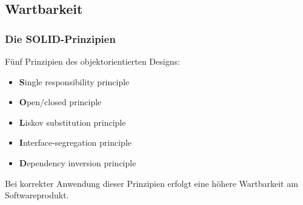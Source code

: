 \documentclass{beamer} %
\begin{document}
\subsection{Wartbarkeit}
\begin{frame}
\frametitle{Die SOLID-Prinzipien}

Fünf Prinzipien des objektorientierten Designs:\newline
\begin{itemize}
\item \textbf{S}ingle responsibility principle
\item \textbf{O}pen/closed principle
\item \textbf{L}iskov substitution principle
\item \textbf{I}nterface-segregation principle
\item \textbf{D}ependency inversion principle \newline
\end{itemize}

Bei korrekter Anwendung dieser Prinzipien erfolgt eine höhere Wartbarkeit am Softwareprodukt.

\end{frame}



%
%
%
%
\end{document}
